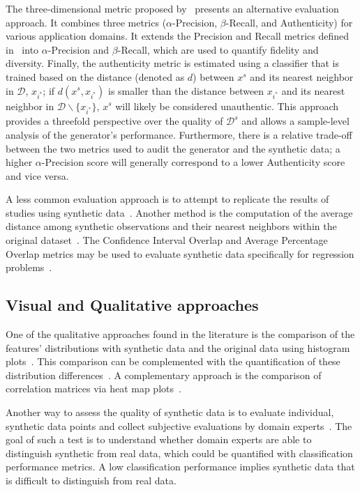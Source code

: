 The three-dimensional metric proposed by~\cite{alaa2022faithful} presents an
alternative evaluation approach. It combines three metrics
($\alpha$-Precision, $\beta$-Recall, and Authenticity) for various application
domains. It extends the Precision and Recall metrics defined
in~\cite{sajjadi2018assessing} into $\alpha$-Precision and $\beta$-Recall,
which are used to quantify fidelity and diversity. Finally, the authenticity
metric is estimated using a classifier that is trained based on the distance
(denoted as $d$) between $x^s$ and its nearest neighbor in $\mathcal{D}$,
$x_{i^*}$; if $d(x^s, x_{i^*})$ is smaller than the distance between $x_{i^*}$
and its nearest neighbor in $\mathcal{D}\backslash \{x_{i^*}\}$, $x^s$ will
likely be considered unauthentic. This approach provides a threefold
perspective over the quality of $\mathcal{D}^s$ and allows a sample-level
analysis of the generator's performance. Furthermore, there is a relative
trade-off between the two metrics used to audit the generator and the
synthetic data; a higher $\alpha$-Precision score will generally correspond to
a lower Authenticity score and vice versa.

A less common evaluation approach is to attempt to replicate the results of
studies using synthetic data~\cite{el2020seven, benaim2020analyzing,
rosenblatt2022epistemic}. Another method is the computation of the
average distance among synthetic observations and their nearest neighbors
within the original dataset~\cite{hittmeir2019utility}. The Confidence
Interval Overlap and Average Percentage Overlap metrics may be used to
evaluate synthetic data specifically for regression
problems~\cite{khan2022utility, karr2006framework}.

\subsection{Visual and Qualitative approaches}

One of the qualitative approaches found in the literature is the comparison of
the features' distributions with synthetic data and the original data using
histogram plots~\cite{hittmeir2019utility}. This comparison can be
complemented with the quantification of these distribution
differences~\cite{el2020seven}. A complementary approach is the comparison of
correlation matrices via heat map plots~\cite{hittmeir2019utility}.

Another way to assess the quality of synthetic data is to evaluate
individual, synthetic data points and collect subjective
evaluations by domain experts~\cite{el2020seven}. The goal of such a test is to
understand whether domain experts are able to distinguish synthetic from real
data, which could be quantified with classification performance metrics. A low
classification performance implies synthetic data that is difficult to
distinguish from real data.
